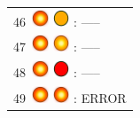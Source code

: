 \documentclass[12pt, a4paper]{report}
\begin{document}
\begin{minipage}{0.45\textwidth}
\begin{Large}
\begin{tabular}{l}
		46\  \includegraphics*[width=5mm]{red_led_flashing} \includegraphics*[width=5mm]{orange_led} : -----\\
		
		47\  \includegraphics*[width=5mm]{red_led_flashing} \includegraphics*[width=5mm]{orange_led_flashing} : -----\\
		
		48\  \includegraphics*[width=5mm]{red_led_flashing} \includegraphics*[width=5mm]{red_led} : -----\\
		
		49\  \includegraphics*[width=5mm]{red_led_flashing} \includegraphics*[width=5mm]{red_led_flashing} : ERROR\\
	\end{tabular}
	\end{Large}
	\end{minipage}%

\vspace{1cm}
\end{document}
